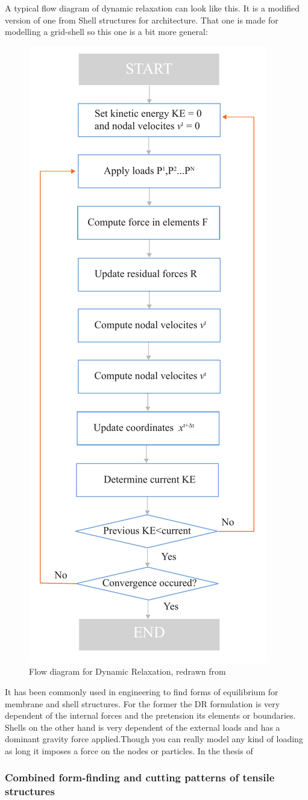 A typical flow diagram of dynamic relaxation can look like this. It is a modified version of one from Shell structures for architecture. That one is made for modelling a grid-shell so this one is a bit more general:

\begin{figure}[H]
\centering
\includegraphics[height=1.2\linewidth ]{figure/Theory/DRScheme.pdf}
\caption{Flow diagram for Dynamic Relaxation, redrawn from \cite{ref:ShellOpt} }
\end{figure}

It has been commonly used in engineering to find forms of equilibrium for membrane and shell structures. For the former the DR formulation is very dependent of the internal forces and the pretension its elements or boundaries. Shells on the other hand is very dependent of the external loads and has a dominant gravity force applied.Though you can really model any kind of loading as long it imposes a force on the nodes or particles. In the thesis of 

\subsubsection{Combined form-finding and cutting patterns of tensile structures}

